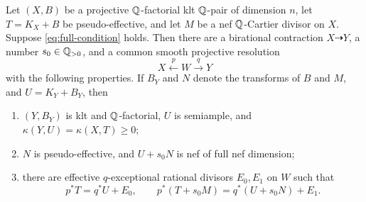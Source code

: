 \begin{lemma}\label{lemma:two-nef-model}
Let $(X,B)$ be a projective $\mathbb Q$-factorial klt $\mathbb Q$-pair of dimension
$n$, let $T=K_X+B$ be pseudo-effective, and let $M$ be a nef
$\mathbb Q$-Cartier divisor on $X$.  Suppose
\eqref{eq:full-condition} holds.  Then there are a birational
contraction $X\dashrightarrow Y$, a number $s_0\in\mathbb Q_{>0}$, and a
common smooth projective resolution
\[
                       X\xleftarrow{p}W\xrightarrow{q}Y
\]
with the following properties.  If $B_Y$ and $N$ denote the transforms
of $B$ and $M$, and $U=K_Y+B_Y$, then
\begin{enumerate}
\item $(Y,B_Y)$ is klt and $\mathbb Q$-factorial, $U$ is semiample, and
$\kappa(Y,U)=\kappa(X,T)\geq0$;
\item $N$ is pseudo-effective, and $U+s_0N$ is nef of full nef
dimension;
\item there are effective $q$-exceptional rational divisors $E_0,E_1$
on $W$ such that
\begin{equation}\label{eq:two-comparisons}
 p^*T=q^*U+E_0,
 \qquad
 p^*(T+s_0M)=q^*(U+s_0N)+E_1.
\end{equation}
\end{enumerate}
\end{lemma}

